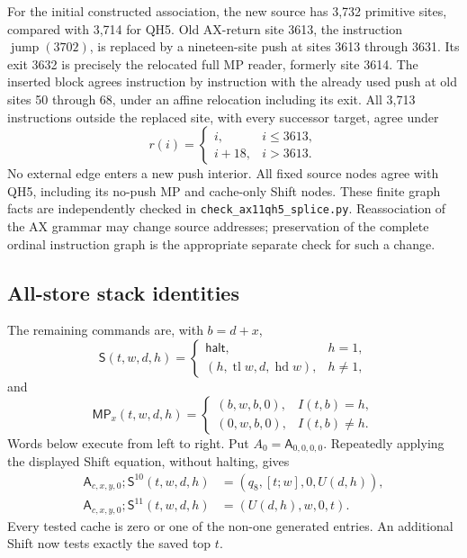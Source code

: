 For the initial constructed association, the new source has 3,732 primitive
sites, compared with 3,714 for QH5. Old AX-return site 3613, the instruction
$\operatorname{jump}(3702)$, is replaced by a nineteen-site push at sites
3613 through 3631. Its exit 3632 is precisely the relocated full MP reader,
formerly site 3614. The inserted block agrees instruction by instruction
with the already used push at old sites 50 through 68, under an affine
relocation including its exit. All 3,713 instructions outside the replaced
site, with every successor target, agree under
\[
 r(i)=\begin{cases}i,&i\le3613,\\i+18,&i>3613.\end{cases}
\]
No external edge enters a new push interior. All fixed source nodes agree
with QH5, including its no-push MP and cache-only Shift nodes. These finite
graph facts are independently checked in
\texttt{check\_ax11qh5\_splice.py}. Reassociation of the AX grammar may
change source addresses; preservation of the complete ordinal instruction
graph is the appropriate separate check for such a change.

\subsection{All-store stack identities}

The remaining commands are, with $b=d+x$,
\[
 \mathsf S(t,w,d,h)=
 \begin{cases}\mathsf{halt},&h=1,\\
 (h,\operatorname{tl}w,d,\operatorname{hd}w),&h\ne1,
 \end{cases}
\]
and
\[
 \mathsf{MP}_x(t,w,d,h)=
 \begin{cases}(b,w,b,0),&I(t,b)=h,\\
 (0,w,b,0),&I(t,b)\ne h.
 \end{cases}
\]
Words below execute from left to right. Put $A_0=\mathsf A_{0,0,0,0}$.
Repeatedly applying the displayed Shift equation, without halting, gives
\begin{align*}
 \mathsf A_{c,x,y,0};\mathsf S^{10}(t,w,d,h)
     &=(q_8,[t;w],0,U(d,h)),\\
 \mathsf A_{c,x,y,0};\mathsf S^{11}(t,w,d,h)
     &=(U(d,h),w,0,t).
\end{align*}
Every tested cache is zero or one of the non-one generated entries.
An additional Shift now tests exactly the saved top $t$.

